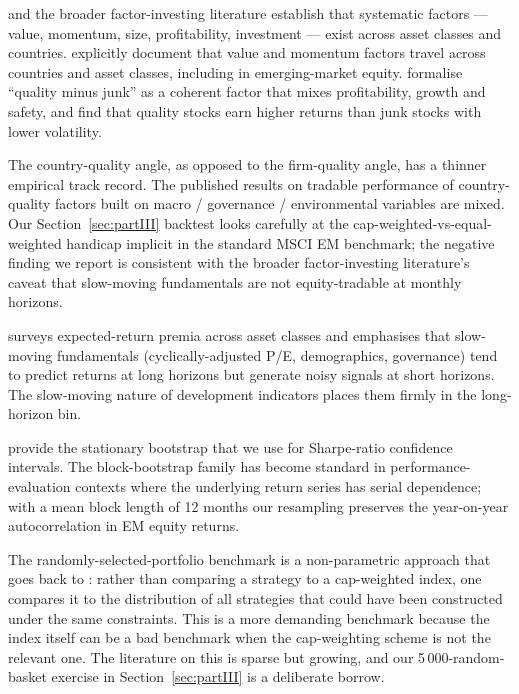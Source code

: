 \textcite{famafrench2015} and the broader factor-investing literature establish that systematic factors --- value, momentum, size, profitability, investment --- exist across asset classes and countries. \textcite{asnessmoskowitzpedersen2013} explicitly document that value and momentum factors travel across countries and asset classes, including in emerging-market equity. \textcite{asnessfrazzinipedersen2019} formalise ``quality minus junk'' as a coherent factor that mixes profitability, growth and safety, and find that quality stocks earn higher returns than junk stocks with lower volatility.

The country-quality angle, as opposed to the firm-quality angle, has a thinner empirical track record. The published results on tradable performance of country-quality factors built on macro / governance / environmental variables are mixed. Our Section~\ref{sec:partIII} backtest looks carefully at the cap-weighted-vs-equal-weighted handicap implicit in the standard MSCI EM benchmark; the negative finding we report is consistent with the broader factor-investing literature's caveat that slow-moving fundamentals are not equity-tradable at monthly horizons.

\textcite{ilmanen2011} surveys expected-return premia across asset classes and emphasises that slow-moving fundamentals (cyclically-adjusted P/E, demographics, governance) tend to predict returns at long horizons but generate noisy signals at short horizons. The slow-moving nature of development indicators places them firmly in the long-horizon bin.

\textcite{politisromano1994} provide the stationary bootstrap that we use for Sharpe-ratio confidence intervals. The block-bootstrap family has become standard in performance-evaluation contexts where the underlying return series has serial dependence; with a mean block length of 12 months our resampling preserves the year-on-year autocorrelation in EM equity returns.

The randomly-selected-portfolio benchmark is a non-parametric approach that goes back to \textcite{ennisetal2013}: rather than comparing a strategy to a cap-weighted index, one compares it to the distribution of all strategies that could have been constructed under the same constraints. This is a more demanding benchmark because the index itself can be a bad benchmark when the cap-weighting scheme is not the relevant one. The literature on this is sparse but growing, and our 5\,000-random-basket exercise in Section~\ref{sec:partIII} is a deliberate borrow.

